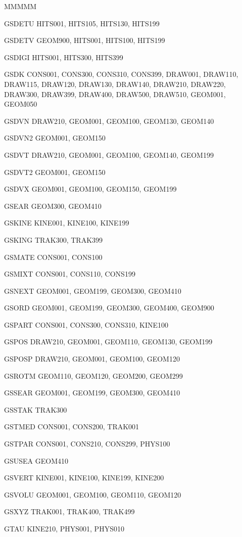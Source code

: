 {\begin{DL}{MMMMM}
\item[GSDETU]HITS001, HITS105, HITS130, HITS199
\item[GSDETV]GEOM900, HITS001, HITS100, HITS199
\item[GSDIGI]HITS001, HITS300, HITS399
\item[GSDK  ]CONS001, CONS300, CONS310, CONS399, DRAW001, DRAW110,  \\
DRAW115, DRAW120, DRAW130, DRAW140, DRAW210, DRAW220,               \\
DRAW300, DRAW399, DRAW400, DRAW500, DRAW510, GEOM001, GEOM050
\item[GSDVN ]DRAW210, GEOM001, GEOM100, GEOM130, GEOM140
\item[GSDVN2]GEOM001, GEOM150
\item[GSDVT ]DRAW210, GEOM001, GEOM100, GEOM140, GEOM199
\item[GSDVT2]GEOM001, GEOM150
\item[GSDVX ]GEOM001, GEOM100, GEOM150, GEOM199
\item[GSEAR ]GEOM300, GEOM410
\item[GSKINE]KINE001, KINE100, KINE199
\item[GSKING]TRAK300, TRAK399
\item[GSMATE]CONS001, CONS100
\item[GSMIXT]CONS001, CONS110, CONS199
\item[GSNEXT]GEOM001, GEOM199, GEOM300, GEOM410
\item[GSORD ]GEOM001, GEOM199, GEOM300, GEOM400, GEOM900
\item[GSPART]CONS001, CONS300, CONS310, KINE100
\item[GSPOS ]DRAW210, GEOM001, GEOM110, GEOM130, GEOM199
\item[GSPOSP]DRAW210, GEOM001, GEOM100, GEOM120
\item[GSROTM]GEOM110, GEOM120, GEOM200, GEOM299
\item[GSSEAR]GEOM001, GEOM199, GEOM300, GEOM410
\item[GSSTAK]TRAK300
\item[GSTMED]CONS001, CONS200, TRAK001
\item[GSTPAR]CONS001, CONS210, CONS299, PHYS100
\item[GSUSEA]GEOM410
\item[GSVERT]KINE001, KINE100, KINE199, KINE200
\item[GSVOLU]GEOM001, GEOM100, GEOM110, GEOM120
\item[GSXYZ ]TRAK001, TRAK400, TRAK499
\item[GTAU  ]KINE210, PHYS001, PHYS010

\end{DL}}
